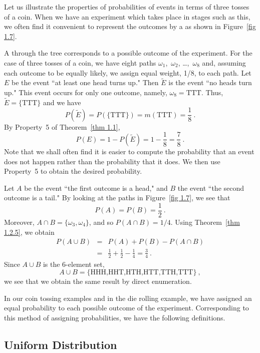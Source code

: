 \begin{example}\label{exam 1.8}
Let us illustrate the properties of probabilities of events in terms of three
tosses of a coin.  When we have an experiment which takes place in stages
such
as this, we often find it convenient to represent the outcomes by a  as shown in Figure~\ref {fig 1.7}.


A  through the tree corresponds to a possible outcome of the
experiment.  For the case of three tosses of a coin, we have eight paths
$\omega_1$,~$\omega_2$, \dots,~$\omega_8$ and, assuming each outcome to be
equally likely, we assign equal weight, 1/8, to each path.  Let $E$ be the
event
``at least one head turns up."  Then $\tilde E$ is the event ``no heads turn
up."  This event occurs for only one outcome, namely, $\omega_8 = \mbox{TTT}$. 
Thus, $\tilde E = \{\mbox{TTT}\}$ and we have
$$
P(\tilde E) = P(\{\mbox{TTT}\}) = m(\mbox{TTT}) = \frac18\ .
$$
By Property~5 of Theorem~\ref{thm 1.1},
$$
P(E) = 1 - P(\tilde E) = 1 - \frac18 = \frac78\ .
$$
Note that we shall often find it is easier to compute the probability that an
event does not happen rather than the probability that it does.  We then use
Property~5 to obtain the desired probability.

Let $A$ be the event ``the first outcome is a head," and $B$ the event ``the
second outcome is a tail."  By looking at the paths in Figure~\ref{fig 1.7},
we see that
$$
P(A) = P(B) = \frac12\ .
$$
Moreover, $A \cap B = \{\omega_3,\omega_4\}$, and so $P(A \cap B) = 1/4.$ 
Using Theorem~\ref{thm 1.2.5}, we obtain
\begin{eqnarray*}
P(A \cup B) & = & P(A) + P(B) - P(A \cap B) \\
& = & \frac 12 + \frac 12 - \frac 14 = \frac 34\ .
\end{eqnarray*}
Since $A \cup B$ is the 6-element set,
$$
A \cup B = \{\mbox{HHH,HHT,HTH,HTT,TTH,TTT}\}\ ,
$$
we see that we obtain the same result by direct enumeration.
\end{example}
\par
In our coin tossing examples and in the die rolling example, we have assigned
an equal probability to each possible outcome of the experiment. 
Corresponding
to this method of assigning probabilities, we have the following definitions.

\subsection*{Uniform Distribution}

